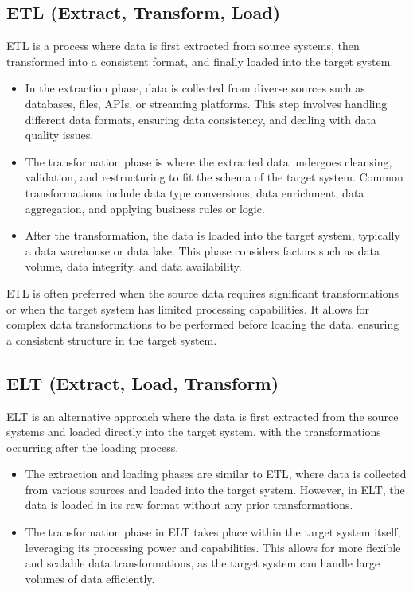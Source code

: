 \subsection{ETL (Extract, Transform, Load)}
ETL is a process where data is first extracted from source systems, then transformed into a consistent format, and finally loaded into the target system\footnotemark[17].

\begin{itemize}
    \item In the extraction phase, data is collected from diverse sources such as databases, files, APIs, or streaming platforms. This step involves handling different data formats, ensuring data consistency, and dealing with data quality issues\footnotemark[17].
    \item The transformation phase is where the extracted data undergoes cleansing, validation, and restructuring to fit the schema of the target system. Common transformations include data type conversions, data enrichment, data aggregation, and applying business rules or logic\footnotemark[17].
    \item After the transformation, the data is loaded into the target system, typically a data warehouse or data lake. This phase considers factors such as data volume, data integrity, and data availability\footnotemark[17].

\end{itemize}

ETL is often preferred when the source data requires significant transformations or when the target system has limited processing capabilities. It allows for complex data transformations to be performed before loading the data, ensuring a consistent structure in the target system\footnotemark[17].

\subsection{ELT (Extract, Load, Transform)}
ELT is an alternative approach where the data is first extracted from the source systems and loaded directly into the target system, with the transformations occurring after the loading process\footnotemark[17].

\begin{itemize}
    \item The extraction and loading phases are similar to ETL, where data is collected from various sources and loaded into the target system. However, in ELT, the data is loaded in its raw format without any prior transformations\footnotemark[17].
    \item The transformation phase in ELT takes place within the target system itself, leveraging its processing power and capabilities. This allows for more flexible and scalable data transformations, as the target system can handle large volumes of data efficiently\footnotemark[17].
\end{itemize}

